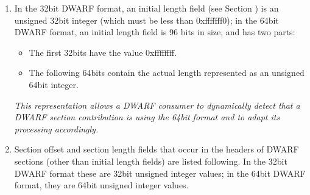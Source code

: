 \begin{enumerate}[1.]

\item  In the 32\dash bit DWARF format, an initial length field
(see Section ) 
is an unsigned 32\dash bit integer (which
must be less than 0xfffffff0); in the 64\dash bit DWARF format,
an initial length field is 96 bits in size, and has two parts:
\begin{itemize}
\item The first 32\dash bits have the value 0xffffffff.

\item  The following 64\dash bits contain the actual length
represented as an unsigned 64\dash bit integer.
\end{itemize}

\textit{This representation allows a DWARF consumer to dynamically
detect that a DWARF section contribution is using the 64\dash bit
format and to adapt its processing accordingly.}

\item Section offset and section length fields that occur
in the headers of DWARF sections (other than initial length
fields) are listed following. In the 32\dash bit DWARF format these
are 32\dash bit unsigned integer values; in the 64\dash bit DWARF format,
they are 64\dash bit unsigned integer values.


\end{enumerate}
